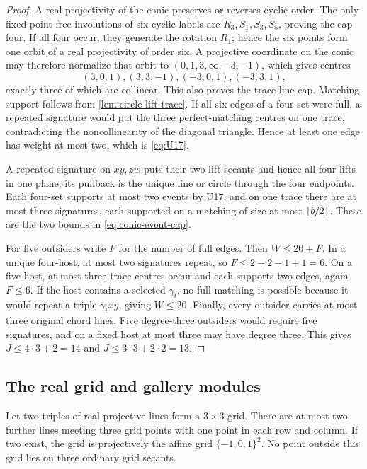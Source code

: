 \begin{proof}
A real projectivity of the conic preserves or reverses cyclic order.  The
only fixed-point-free involutions of six cyclic labels are
$R_3,S_1,S_3,S_5$, proving the cap four.  If all four occur, they generate
the rotation $R_1$; hence the six points form one orbit of a real
projectivity of order six.  A projective coordinate on the conic may
therefore normalize that orbit to $(0,1,3,\infty,-3,-1)$, which gives centres
\[
 (3,0,1),(3,3,-1),(-3,0,1),(-3,3,1),
\]
exactly three of which are collinear.  This also proves the trace-line cap.
Matching support follows from \cref{lem:circle-lift-trace}.  If all six
edges of a four-set were full, a repeated signature would put the three
perfect-matching centres on one trace, contradicting the noncollinearity of
the diagonal triangle.  Hence at least one edge has weight at most two,
which is \eqref{eq:U17}.

A repeated signature on $xy,zw$ puts their two lift secants and hence all
four lifts in one plane; its pullback is the unique line or circle through
the four endpoints.  Each four-set supports at most two events by U17, and
on one trace there are at most three signatures, each supported on a
matching of size at most $\left\lfloor b/2\right\rfloor$.  These are the two bounds in
\eqref{eq:conic-event-cap}.

For five outsiders write $F$ for the number of full edges.  Then
$W\le20+F$.  In a unique four-host, at most two signatures repeat, so
$F\le2+2+1+1=6$.  On a five-host, at most three trace centres occur and
each supports two edges, again $F\le6$.  If the host contains a selected
$\gamma_i$, no full matching is possible because it would repeat a triple
$\gamma_i xy$, giving $W\le20$.  Finally, every outsider carries at most
three original chord lines.  Five degree-three outsiders would require five
signatures, and on a fixed host at most three may have degree three.  This
gives $J\le4\cdot3+2=14$ and $J\le3\cdot3+2\cdot2=13$.
\end{proof}

\subsection{The real grid and gallery modules}

\begin{lemma}\label{lem:real-grid}
Let two triples of real projective lines form a $3\times3$ grid.  There are
at most two further lines meeting three grid points with one point in each
row and column.  If two exist, the grid is projectively the affine grid
$\{-1,0,1\}^2$.  No point outside this grid lies on three ordinary grid
secants.
\end{lemma}

